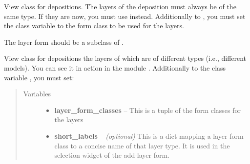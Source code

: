 \documentclass[a4paper,11pt,english]{sphinxmanual}
\begin{document}

\begin{fulllineitems}
\label{programming/class-based_views:samples.utils.views.DepositionView}
View class for depositions.  The layers of the deposition must always be of
the same type.  If they are now, you must use
 instead.  Additionally to
, you must set the  class
variable to the form class to be used for the layers.

The layer form should be a subclass of {\hyperref[programming/class-based_views:samples.utils.views.SubprocessForm]{}}.

\end{fulllineitems}


\begin{fulllineitems}
\label{programming/class-based_views:samples.utils.views.DepositionMultipleTypeView}
View class for depositions the layers of which are of different types (i.e.,
different models).  You can see it in action in the module
.  Additionally to
the class variable , you must set:
\begin{quote}\begin{description}
\item[{Variables}] \leavevmode\begin{itemize}
\item {} 
\textbf{layer\_form\_classes} -- This is a tuple of the form classes for the layers

\item {} 
\textbf{short\_labels} -- \emph{(optional)} This is a dict mapping a layer form class
to a concise name of that layer type.  It is used in the selection widget
of the add-layer form.

\end{itemize}

\end{description}\end{quote}

\end{fulllineitems}
\end{document}
